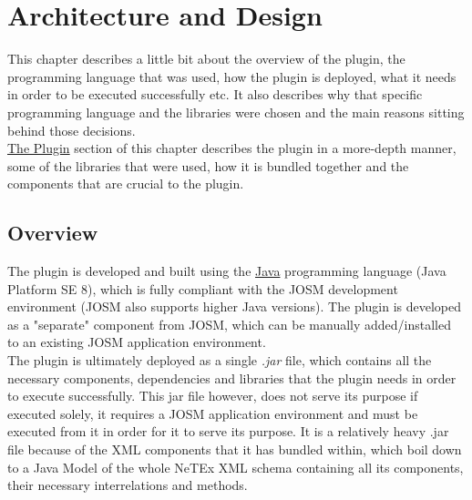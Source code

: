 \chapter{Architecture and Design}
This chapter describes a little bit about the overview of the plugin, the programming language that was used, how the plugin is deployed, what it needs in order to be executed successfully etc. It also describes why that specific programming language and the libraries were chosen and the main reasons sitting behind those decisions.\\
\hyperref[sec:ThePlugin]{The Plugin} section of this chapter describes the plugin in a more-depth manner, some of the libraries that were used, how it is bundled together and the components that are crucial to the plugin.
\section{Overview}
The plugin is developed and built using the \href{https://www.java.com/en/}{Java} programming language (Java Platform SE 8), which is fully compliant with the JOSM development environment (JOSM also supports higher Java versions). The plugin is developed as a "separate" component from JOSM, which can be manually added/installed to an existing JOSM application environment.\\
\newline
The plugin is ultimately deployed as a single \textit{.jar} file, which contains all the necessary components, dependencies and libraries that the plugin needs in order to execute successfully. This jar file however, does not serve its purpose if executed solely, it requires a JOSM application environment and must be executed from it in order for it to serve its purpose. It is a relatively heavy .jar file because of the XML components that it has bundled within, which boil down to a Java Model of the whole NeTEx XML schema containing all its components, their necessary interrelations and methods.

